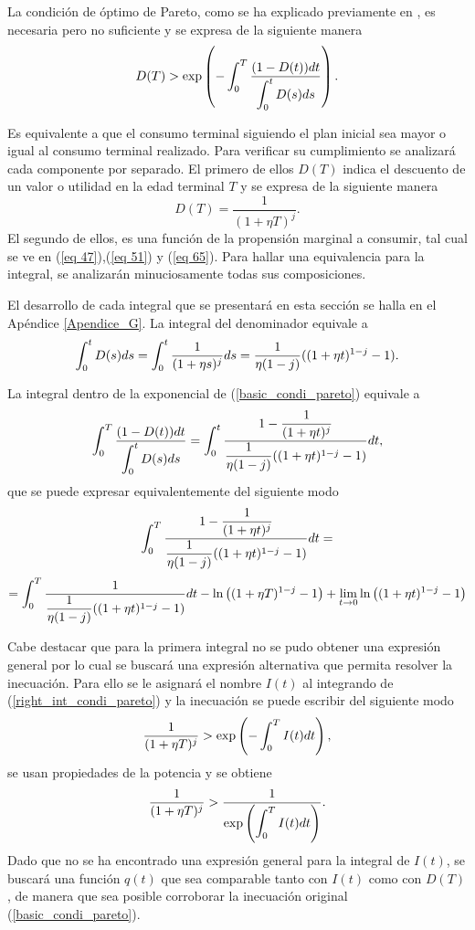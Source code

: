 La condición de óptimo de Pareto, como se ha explicado previamente en \parencite{feigenbaum2021deviation}, es necesaria pero no suficiente y se expresa de la siguiente manera
\begin{equation}
\label{basic_condi_pareto}
D(T)> \exp \left( - \displaystyle \int_0^T \dfrac{(1- D(t)) dt}{\displaystyle \int_0^{t} D(s) ds}\right).    
\end{equation}

Es equivalente a que el consumo terminal siguiendo el plan inicial sea mayor o igual al consumo terminal realizado.
Para verificar su cumplimiento se analizará cada componente por separado. 
%
El primero de ellos $D(T)$ indica el descuento de un valor o utilidad en la edad terminal $T$ y se expresa de la siguiente manera 
$$D(T)=\dfrac{1}{(1+\eta T)^j}.$$
%
El segundo de ellos, es una función de la propensión marginal a consumir, tal cual se ve en (\ref{eq 47}),(\ref{eq 51}) y (\ref{eq 65}). Para hallar una equivalencia para la integral, se analizarán minuciosamente todas sus composiciones.

El desarrollo de cada integral que se presentará en esta sección se halla en el Apéndice \ref{Apendice_G}. La integral del denominador equivale a
$$\displaystyle \int_0^{t} D(s) ds=\displaystyle \int_0^{t} \dfrac{1}{(1+\eta s)^j} ds=\dfrac{1}{\eta(1-j)}((1+\eta t)^{1-j}-1).$$

La integral dentro de la exponencial de (\ref{basic_condi_pareto}) equivale a
\begin{equation}
\label{right_int_condi_pareto}\displaystyle \int_0^T \dfrac{(1- D(t)) dt}{\displaystyle \int_0^{t} D(s) ds} =
\displaystyle \int_0^{t} \dfrac{1 - \dfrac{1}{(1+\eta t)^j}}{\dfrac{1}{\eta(1-j)}((1+\eta t)^{1-j}-1)} dt,\end{equation}
que se puede expresar equivalentemente del siguiente modo
\begin{equation*}
        \displaystyle \int_0^{T} \dfrac{1 - \dfrac{1}{(1+\eta t)^j}}{\dfrac{1}{\eta(1-j)}((1+\eta t)^{1-j}-1)} dt=
\end{equation*}
\begin{equation*}
        =\displaystyle \int_0^{T} \dfrac{1}{\dfrac{1}{\eta(1-j)}((1+\eta t)^{1-j}-1)} dt-\ln\left( (1+\eta T)^{1-j}-1\right)+\lim_{t \to 0} \ln\left( (1+\eta t)^{1-j}-1\right)
\end{equation*}

Cabe destacar que para la primera integral no se pudo obtener una expresión general por lo cual se buscará una expresión alternativa que permita resolver la inecuación. Para ello se le asignará el nombre $I(t)$ al integrando de (\ref{right_int_condi_pareto}) y la inecuación se puede escribir del siguiente modo 
$$\dfrac{1}{(1+\eta T)^j}> \exp\left(-\displaystyle \int_0^{T}I(t)dt
\right),$$
se usan propiedades de la potencia y se obtiene
$$\dfrac{1}{(1+\eta T)^j}>\dfrac{1}{\exp\left(\displaystyle \int_0^{T}I(t)dt\right)}. $$
Dado que no se ha encontrado una expresión general para la integral de $I(t)$, se buscará una función $q(t)$ que sea comparable tanto con $I(t)$ como con $D(T)$, de manera que sea posible corroborar la inecuación original (\ref{basic_condi_pareto}).

